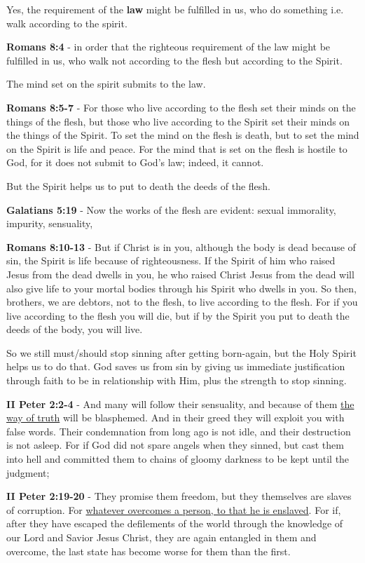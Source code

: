 \documentclass[11pt]{article}
\begin{document}
Yes, the requirement of the \textbf{law} might be fulfilled in us, who do something i.e. walk according to the spirit.

\textbf{Romans 8:4} - in order that the righteous requirement of the law might be fulfilled in us, who walk not according to the flesh but according to the Spirit.

The mind set on the spirit submits to the law.

\textbf{Romans 8:5-7} - For those who live according to the flesh set their minds on the things of the flesh, but those who live according to the Spirit set their minds on the things of the Spirit.  To set the mind on the flesh is death, but to set the mind on the Spirit is life and peace.  For the mind that is set on the flesh is hostile to God, for it does not submit to God's law; indeed, it cannot.

But the Spirit helps us to put to death the deeds of the flesh.

\textbf{Galatians 5:19} - Now the works of the flesh are evident: sexual immorality, impurity, sensuality,

\textbf{Romans 8:10-13} - But if Christ is in you, although the body is dead because of sin, the Spirit is life because of righteousness. If the Spirit of him who raised Jesus from the dead dwells in you, he who raised Christ Jesus from the dead will also give life to your mortal bodies through his Spirit who dwells in you. So then, brothers, we are debtors, not to the flesh, to live according to the flesh. For if you live according to the flesh you will die, but if by the Spirit you put to death the deeds of the body, you will live.

So we still must/should stop sinning after getting born-again, but the Holy Spirit helps us to do that.
God saves us from sin by giving us immediate justification through faith to be in relationship with Him, plus the strength to stop sinning.

\textbf{II Peter 2:2-4} - And many will follow their sensuality, and because of them \uline{the way of truth} will be blasphemed. And in their greed they will exploit you with false words. Their condemnation from long ago is not idle, and their destruction is not asleep. For if God did not spare angels when they sinned, but cast them into hell and committed them to chains of gloomy darkness to be kept until the judgment;

\textbf{II Peter 2:19-20} - They promise them freedom, but they themselves are slaves of corruption. For \uline{whatever overcomes a person, to that he is enslaved}. For if, after they have escaped the defilements of the world through the knowledge of our Lord and Savior Jesus Christ, they are again entangled in them and overcome, the last state has become worse for them than the first.
\end{document}
